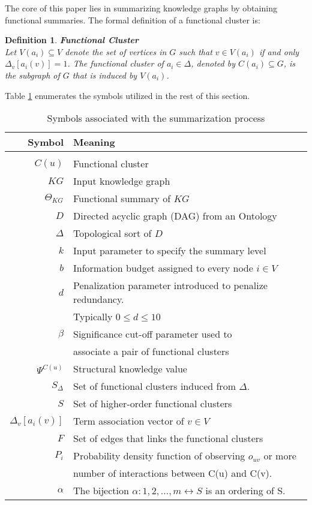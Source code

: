 \documentclass{ieeeaccess}
\newtheorem{Definition}{Definition}
\begin{document}
The core of this paper lies in summarizing knowledge graphs by obtaining
functional summaries. The formal definition of a functional cluster
is:

\begin{Definition}
\textbf{Functional Cluster} \\
Let $ V (a_{i}) \subseteq V$ denote the set of
vertices in $G$ such that $v \in V (a_{i})$ if and only 
$ \Delta_{v} [a_{i}(v)] = 1$. The functional cluster of  $a_{i} \in \Delta$, 
denoted by $C(a_{i}) \subseteq G$, is the subgraph of $G$ that is induced 
by $V (a_{i})$.

\end{Definition}

Table \ref{tab:Symbols} enumerates the symbols utilized in the rest of this section.

\begin{table}[!ht]
\caption{Symbols associated with the summarization process}
\label{tab:Symbols}
\centering
\begin{tabular}{r|l}
\hline
\bfseries Symbol & \bfseries Meaning \\ \hline \\
$C(u)$ & Functional cluster \\
$KG$ & Input knowledge graph \\
$\Theta_{KG}$ & Functional summary of $KG$\\
$D$ & Directed acyclic graph (DAG) from an Ontology \\
$\Delta$ & Topological sort of $D$ \\
$k$ & Input parameter to specify the summary level \\
$b$ & Information budget assigned to every node $i \in V$ \\
$d$ & Penalization parameter introduced to penalize redundancy. \\
& Typically  $0 \leq d \leq 10$ \\
$\beta$ & Significance cut-off parameter used to \\ 
& associate a pair of functional clusters \\
$\Psi^{C(u)}$ & Structural knowledge value \\
$S_{\Delta}$ & Set of functional clusters induced from $\Delta$.\\
$S$ & Set of higher-order functional clusters \\
$\Delta_{v}[a_{i}(v)]$ & Term association vector of $v \in V$ \\
$F$ & Set of edges that links the functional clusters \\
$P_{i}$ & Probability density function of observing $o_{uv}$ or more \\
& number of interactions between C(u) and C(v). \\
$\alpha$ & The bijection $\alpha : 1, 2, \dots ,m \leftrightarrow S$ is an ordering of S. \\
\hline
\end{tabular}
\end{table}
\end{document}
